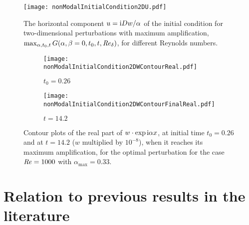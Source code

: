 \documentclass{jfm}
\newcommand\Rey{\mbox{\textit{Re}}}  %
\begin{document}
\begin{figure}
  \centering
  \texttt{[image: nonModalInitialCondition2DU.pdf]}
  \caption{The horizontal component $ u = {\rm i} Dw/\alpha $ of the initial condition 
    for two-dimensional perturbations with maximum amplification,
    $ \max_{\alpha,t_0,t} G(\alpha,\beta=0,t_0,t,\Rey_\delta) $, for
    different Reynolds numbers.}
  \label{fig:initialCondition2DU}
\end{figure}


\begin{figure}
  \centering
  \begin{subfigure}[b]{0.5\textwidth}
    \texttt{[image: nonModalInitialCondition2DWContourReal.pdf]}
    \caption{$ t_0 = 0.26 $}
    \label{fig:contourB}
  \end{subfigure} \nolinebreak
  \begin{subfigure}[b]{0.5\textwidth}
    \texttt{[image: nonModalInitialCondition2DWContourFinalReal.pdf]}
    \caption{$ t = 14.2 $}
    \label{fig:contourC}
  \end{subfigure} 
  \caption{Contour plots of the real part of
    $ w \cdot \exp {\rm i} \alpha x $,
    at initial time $ t_0 = 0.26 $ and at $ t = 14.2 $ ($ w $ multiplied by
    $ 10^{-8} $),
    when it reaches its maximum amplification,
    for the optimal perturbation for the case $ \Rey = 1000 $ with
    $ \alpha_{\max} = 0.33 $.}
  \label{fig:initialCondition2DContour}
\end{figure}



\section{Relation to previous results in the literature}
\label{sec:otherworks}
\end{document}
